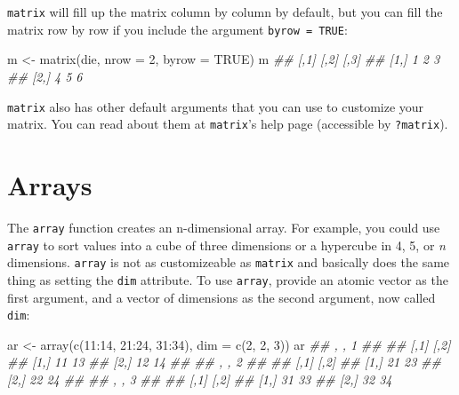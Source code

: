 \documentclass[
  letterpaper,
  DIV=11,
  numbers=noendperiod]{scrbook}
\newenvironment{Shaded}{\begin{snugshade}}{\end{snugshade}}
\newcommand{\AttributeTok}[1]{\textcolor[rgb]{0.40,0.45,0.13}{#1}}
\newcommand{\ConstantTok}[1]{\textcolor[rgb]{0.56,0.35,0.01}{#1}}
\newcommand{\DecValTok}[1]{\textcolor[rgb]{0.68,0.00,0.00}{#1}}
\newcommand{\DocumentationTok}[1]{\textcolor[rgb]{0.37,0.37,0.37}{\textit{#1}}}
\newcommand{\FunctionTok}[1]{\textcolor[rgb]{0.28,0.35,0.67}{#1}}
\newcommand{\NormalTok}[1]{\textcolor[rgb]{0.00,0.23,0.31}{#1}}
\newcommand{\OtherTok}[1]{\textcolor[rgb]{0.00,0.23,0.31}{#1}}
\newcommand{\SpecialCharTok}[1]{\textcolor[rgb]{0.37,0.37,0.37}{#1}}
\begin{document}
\texttt{matrix} will fill up the matrix column by column by default, but
you can fill the matrix row by row if you include the argument
\texttt{byrow\ =\ TRUE}:

\begin{Shaded}
\begin{Highlighting}[]
\NormalTok{m }\OtherTok{\textless{}{-}} \FunctionTok{matrix}\NormalTok{(die, }\AttributeTok{nrow =} \DecValTok{2}\NormalTok{, }\AttributeTok{byrow =} \ConstantTok{TRUE}\NormalTok{)}
\NormalTok{m}
\DocumentationTok{\#\#      [,1] [,2] [,3]}
\DocumentationTok{\#\# [1,]    1    2    3}
\DocumentationTok{\#\# [2,]    4    5    6}
\end{Highlighting}
\end{Shaded}

\texttt{matrix} also has other default arguments that you can use to
customize your matrix. You can read about them at \texttt{matrix}'s help
page (accessible by \texttt{?matrix}).

\section{Arrays}\label{arrays}

The \texttt{array} function creates an n-dimensional array. For example,
you could use \texttt{array} to sort values into a cube of three
dimensions or a hypercube in 4, 5, or \emph{n} dimensions.
\texttt{array} is not as customizeable as \texttt{matrix} and basically
does the same thing as setting the \texttt{dim} attribute. To use
\texttt{array}, provide an atomic vector as the first argument, and a
vector of dimensions as the second argument, now called \texttt{dim}:

\begin{Shaded}
\begin{Highlighting}[]
\NormalTok{ar }\OtherTok{\textless{}{-}} \FunctionTok{array}\NormalTok{(}\FunctionTok{c}\NormalTok{(}\DecValTok{11}\SpecialCharTok{:}\DecValTok{14}\NormalTok{, }\DecValTok{21}\SpecialCharTok{:}\DecValTok{24}\NormalTok{, }\DecValTok{31}\SpecialCharTok{:}\DecValTok{34}\NormalTok{), }\AttributeTok{dim =} \FunctionTok{c}\NormalTok{(}\DecValTok{2}\NormalTok{, }\DecValTok{2}\NormalTok{, }\DecValTok{3}\NormalTok{))}
\NormalTok{ar}
\DocumentationTok{\#\# , , 1}
\DocumentationTok{\#\# }
\DocumentationTok{\#\#      [,1] [,2]}
\DocumentationTok{\#\# [1,]   11   13}
\DocumentationTok{\#\# [2,]   12   14}
\DocumentationTok{\#\# }
\DocumentationTok{\#\# , , 2}
\DocumentationTok{\#\# }
\DocumentationTok{\#\#      [,1] [,2]}
\DocumentationTok{\#\# [1,]   21   23}
\DocumentationTok{\#\# [2,]   22   24}
\DocumentationTok{\#\# }
\DocumentationTok{\#\# , , 3}
\DocumentationTok{\#\# }
\DocumentationTok{\#\#      [,1] [,2]}
\DocumentationTok{\#\# [1,]   31   33}
\DocumentationTok{\#\# [2,]   32   34}
\end{Highlighting}
\end{Shaded}
\end{document}
